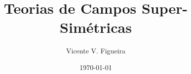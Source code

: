 \documentclass[twoside]{amsart}
\title{
Teorias de Campos Super-Simétricas
}
\author{
  Vicente V. Figueira
       }
\date{\today}
\numberwithin{equation}{section}
\begin{document}
\maketitle



\nocite{*}










\newpage

\printbibliography
\end{document}
